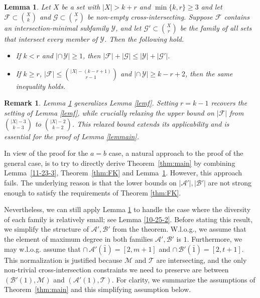 \documentclass[11pt]{article}
\newcommand{\m}{\mathcal}
\newtheorem{lemma}[theorem]{Lemma}
\newtheorem*{remark*}{Remark} %
\begin{document}
\begin{lemma}\label{lemkey}
Let $X$ be a set with $|X|>k+r$ and $\min \{k,r\}\ge 3$ and let $\m F\subset {X\choose k}$ and $\m G\subset {X\choose r}$ be non-empty cross-intersecting. 
Suppose $\m F$ contains an intersection-minimal subfamily $\m Y$, and let $\m G'\subset{X\choose r}$ be the family of all sets that intersect every member of $\m Y$. Then the following hold.
\begin{itemize}
\item[(i)] If $k<r$ and $|\cap \, \m Y|\ge 1$, then  
$|\m F|+|\m G|\le |\m Y|+|\m G'|.$
\item[(ii)] If  $k\ge r$, 
$|\m F|\le {|X|-(k-r+1)\choose r-1}$ and $|\cap \, \m Y|\ge k-r+2$,
then the same inequality holds.
\end{itemize}
\end{lemma}

\begin{remark*}
Lemma \ref{lemkey} generalizes Lemma \ref{lemf}. 
Setting $r=k-1$ recovers the setting of Lemma \ref{lemf}, while crucially relaxing the upper bound on $|\m F|$ from ${|X|-3\choose k-3}$ to ${|X|-2\choose k-2}$. This relaxed bound extends its applicability and is essential for the proof of Lemma \ref{lemmain}.
\end{remark*}

In view of the proof for the $a=b$ case, a natural approach to the proof of the general case, is to try to  directly derive Theorem~\ref{thm:main} by combining Lemma~\ref{11-23-3}, Theorem~\ref{thm:FK} and Lemma~\ref{lemkey}. However, this approach fails. The underlying reason is that the lower bounds on $|\m A'|, |\m B'|$ are not strong enough to  satisfy the requirements of Theorem \ref{thm:FK}. 

Nevertheless, we can still apply Lemma \ref{lemkey} to handle the case where the diversity of each family is relatively small; see Lemma \ref{10-25-2}. 
Before stating this result, we simplify the structure of $\m A', \m B'$ from the theorem. W.l.o.g., we assume that the element of maximum degree in both families $\m A', \m B'$ is $1$. 
Furthermore, we may w.l.o.g. assume that $\cap\, \m A'(\bar1) = [2,m+1]$ and $\cap\, \m B'(\bar 1) = [2,t+1]$.
This normalization is justified because $\mathcal{M}$ and $\mathcal{T}$ are intersecting, and the only non-trivial cross-intersection constraints we need to preserve are between $(\mathcal{B}'(1), \mathcal{M})$ and $(\mathcal{A}'(1), \mathcal{T})$.
For clarity, we summarize the assumptions of Theorem~\ref{thm:main} and this simplifying assumption below.
\end{document}
